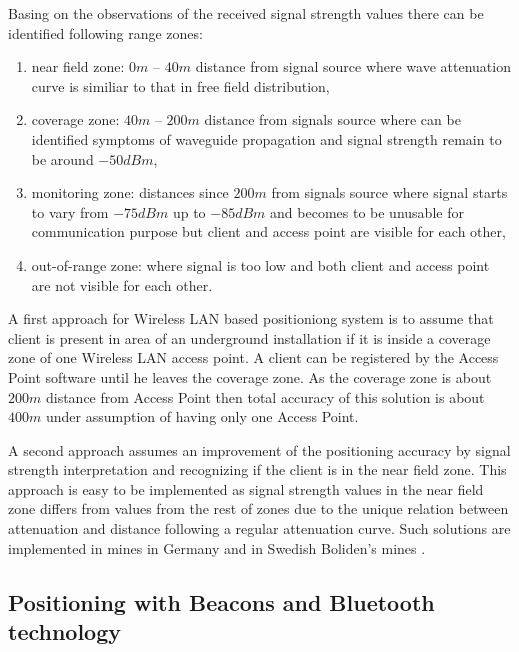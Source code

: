 \documentclass[../main.tex]{subfiles}
\begin{document}
Basing on the observations of the received signal strength values there can be identified following range zones\cite{Thesis_CM}:
\begin{enumerate}
	\item near field zone: $0m$ -- $40m$ distance from signal source where wave attenuation curve is similiar to that in free field distribution,
	\item coverage zone: $40m$ -- $200m$ distance from signals source where can be identified symptoms of waveguide propagation and signal strength remain to be around $-50 dBm$,
	\item monitoring zone: distances since $200m$ from signals source where signal starts to vary from $-75dBm$ up to $-85 dBm$ and becomes to be unusable for communication purpose but client and access point are visible for each other,
	\item out-of-range zone: where signal is too low and both client and access point are not visible for each other.
\end{enumerate}

A first approach for Wireless LAN based positioniong system is to assume that client is present in area of an underground installation if it is inside a coverage zone of one Wireless LAN access point. A client can be registered by the Access Point software until he leaves the coverage zone. As the coverage zone is about $200m$  distance from Access Point then total accuracy of this solution is about $400 m$ under assumption of having only one Access Point.

A second approach assumes an improvement of the positioning accuracy by signal strength interpretation and recognizing if the client is in the near field zone. This approach is easy to be implemented as signal strength values in the near field zone differs from values from the rest of zones due to the unique relation between attenuation and distance following a regular attenuation curve. Such solutions are implemented in mines in Germany \cite{Thesis_CM} and in Swedish Boliden's mines \cite{thesis_tablet_positioning}.





\subsection{Positioning with Beacons and Bluetooth technology} %
\label{sec:positioning_with_beacons_and_bluetooth_technology}
\end{document}
